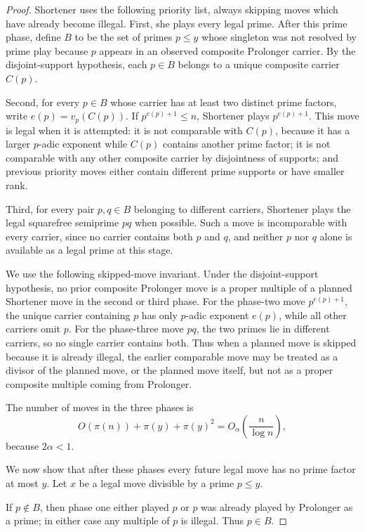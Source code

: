 \begin{proof}
Shortener uses the following priority list, always skipping moves which have
already become illegal.  First, she plays every legal prime.  After this prime
phase, define $B$ to be the set of primes $p\le y$ whose singleton was not
resolved by prime play because $p$ appears in an observed composite Prolonger
carrier.  By the disjoint-support hypothesis, each $p\in B$ belongs to a
unique composite carrier $C(p)$.

Second, for every $p\in B$ whose carrier has at least two distinct prime
factors, write $e(p)=v_p(C(p))$.  If $p^{e(p)+1}\le n$, Shortener plays
$p^{e(p)+1}$.  This move is legal when it is attempted: it is not comparable
with $C(p)$, because it has a larger $p$-adic exponent while $C(p)$ contains
another prime factor; it is not comparable with any other composite carrier by
disjointness of supports; and previous priority moves either contain different
prime supports or have smaller rank.

Third, for every pair $p,q\in B$ belonging to different carriers, Shortener
plays the legal squarefree semiprime $pq$ when possible.  Such a move is
incomparable with every carrier, since no carrier contains both $p$ and $q$,
and neither $p$ nor $q$ alone is available as a legal prime at this stage.

We use the following skipped-move invariant.  Under the disjoint-support
hypothesis, no prior composite Prolonger move is a proper multiple of a planned
Shortener move in the second or third phase.  For the phase-two move
$p^{e(p)+1}$, the unique carrier containing $p$ has only $p$-adic exponent
$e(p)$, while all other carriers omit $p$.  For the phase-three move $pq$, the
two primes lie in different carriers, so no single carrier contains both.  Thus
when a planned move is skipped because it is already illegal, the earlier
comparable move may be treated as a divisor of the planned move, or the planned
move itself, but not as a proper composite multiple coming from Prolonger.

The number of moves in the three phases is
\[
  O(\pi(n))+\pi(y)+\pi(y)^2
  =
  O_\alpha\!\left(\frac n{\log n}\right),
\]
because $2\alpha<1$.

We now show that after these phases every future legal move has no prime
factor at most $y$.  Let $x$ be a legal move divisible by a prime $p\le y$.

If $p\notin B$, then phase one either played $p$ or $p$ was already played by
Prolonger as a prime; in either case any multiple of $p$ is illegal.  Thus
$p\in B$.


\end{proof}
